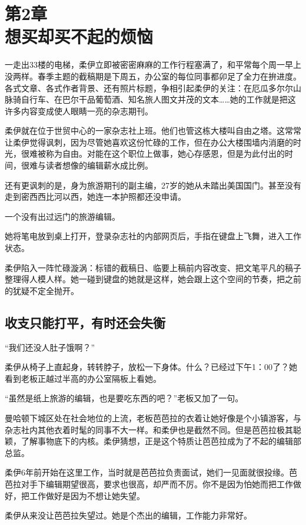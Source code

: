 \section[第2章\q 想买却买不起的烦恼]{第2章\\ 想买却买不起的烦恼}
\label{sec:ch2}

一走出33楼的电梯，柔伊立即被密密麻麻的工作行程塞满了，和平常每个周一早上没两样。春季主题的截稿期是下周五，办公室的每位同事都卯足了全力在拚进度。各式文章、各式作者背景、还有照片标题，争相引起柔伊的关注：在厄瓜多尔尔山脉骑自行车、在巴尔干品葡萄酒、知名旅人图文并茂的文本……她的工作就是把这许多内容变成使人眼睛一亮的杂志期刊。

柔伊就在位于世贸中心的一家杂志社上班。他们也管这栋大楼叫自由之塔。这常常让柔伊觉得讽刺，因为尽管她喜欢这份忙碌的工作，但在办公大楼围墙内消磨的时光，很难被称为自由。对能在这个职位上做事，她心存感恩，但是为此付出的时间，很难与读者想像的编辑薪水成比例。

还有更讽刺的是，身为旅游期刊的副主编，27岁的她从未踏出美国国门。甚至没有走到密西西比河以西，她连一本护照都还没申请。

一个没有出过远门的旅游编辑。

她将笔电放到桌上打开，登录杂志社的内部网页后，手指在键盘上飞舞，进入工作状态。

柔伊陷入一阵忙碌漩涡：标错的截稿日、临要上稿前内容改变、把文笔平凡的稿子整理得人模人样。她一碰到键盘的她就是这样，她会跟上这个空间的节奏，把之前的犹疑不定全抛开。

\subsection{收支只能打平，有时还会失衡}

“我们还没人肚子饿啊？”

柔伊从椅子上直起身，转转脖子，放松一下身体。什么？已经过下午1：00了？她看到老板正越过半高的办公室隔板上看她。

“虽然是纸上旅游的编辑，也是要吃东西的吧？”老板又加了一句。

曼哈顿下城区处在社会地位的上流，老板芭芭拉的衣着让她好像是个小镇游客，与杂志社内其他衣着时髦的同事不大一样。和柔伊也是截然不同。但是芭芭拉极其聪颖，了解事物底下的内核。柔伊猜想，正是这个特质让芭芭拉成为了不起的编辑部总监。

柔伊6年前开始在这里工作，当时就是芭芭拉负责面试，她们一见面就很投缘。芭芭拉对手下编辑期望很高，要求也很高，却严而不厉。你不是因为怕她而把工作做好，把工作做好是因为不想让她失望。

柔伊从来没让芭芭拉失望过。她是个杰出的编辑，工作能力非常好。

